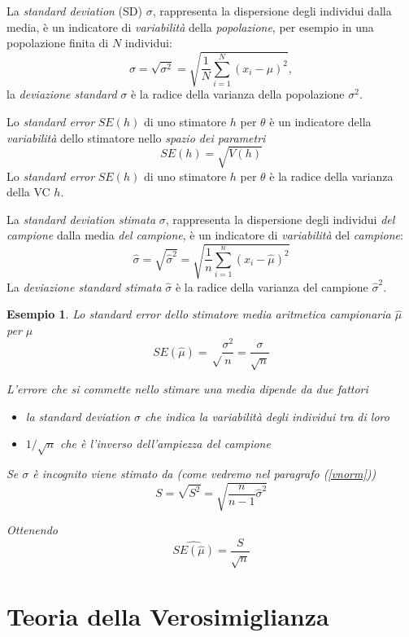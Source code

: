 \documentclass[
  11pt,
]{book}
\providecommand{\tightlist}{%
  \setlength{\itemsep}{0pt}\setlength{\parskip}{0pt}}
\theoremstyle{mytheoremstyle}
\theoremstyle{mydefstyle}
\newtheorem{example}{{Esempio}}[section]
\begin{document}
\begin{info}
La \emph{standard deviation} (SD) \(\sigma\), rappresenta la dispersione degli individui dalla media, è un indicatore di \emph{variabilità} della \emph{popolazione}, per esempio in una popolazione finita di \(N\) individui:
\[\sigma=\sqrt{\sigma^2}=\sqrt{\frac 1 N\sum_{i=1}^N(x_i-\mu)^2},\]
la \emph{deviazione standard} \(\sigma\) è la radice della varianza della popolazione \(\sigma^2\).

Lo \emph{standard error} \(SE(h)\) di uno stimatore \(h\) per \(\theta\) è un indicatore della \emph{variabilità} dello stimatore nello \emph{spazio dei parametri}
\[SE(h)=\sqrt{V(h)}\]
Lo \emph{standard error} \(SE(h)\) di uno stimatore \(h\) per \(\theta\) è la radice della varianza della VC \(h\).

La \emph{standard deviation stimata} \(\sigma\), rappresenta la dispersione degli individui \emph{del campione} dalla media \emph{del campione}, è un indicatore di \emph{variabilità} del \emph{campione}:
\[\hat\sigma=\sqrt{\hat\sigma^2}=\sqrt{\frac 1 n\sum_{i=1}^n(x_i-\hat\mu)^2}\]
La \emph{deviazione standard stimata} \(\hat\sigma\) è la radice della varianza del campione \(\hat\sigma^2\).

\end{info}

\begin{example}
Lo standard error dello stimatore media aritmetica campionaria \(\hat\mu\) per \(\mu\)
\[SE(\hat \mu)=\sqrt\frac{\sigma^2} n=\frac\sigma {\sqrt{n}}\]

L'errore che si commette nello stimare una media dipende da due fattori

\begin{itemize}
\tightlist
\item
  la \emph{standard deviation} \(\sigma\) che indica la variabilità degli individui tra di loro
\item
  \(1/\sqrt n\) che è l'inverso dell'ampiezza del campione
\end{itemize}

Se \(\sigma\) è incognito viene stimato da (come vedremo nel paragrafo (\ref{vnorm}))
\[S=\sqrt{S^2}=\sqrt{\frac{n}{n-1}\hat\sigma^2}\]

Ottenendo
\[\widehat{SE(\hat\mu)}=\frac S {\sqrt n}\]
\end{example}

\chapter{Teoria della Verosimiglianza}\label{teoria-della-verosimiglianza}
\end{document}

